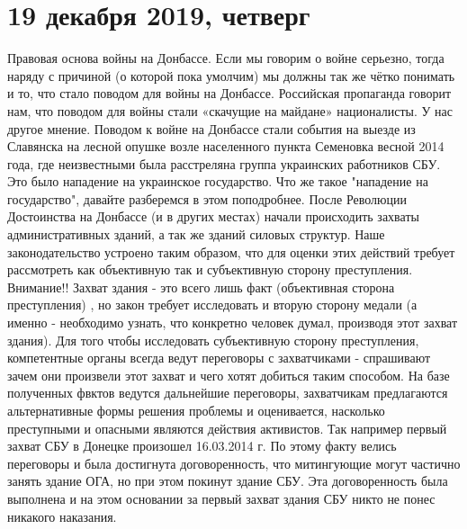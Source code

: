  
 
 
 
 
\section{19 декабря 2019, четверг}
\label{sec:19_12_2019}

Правовая основа войны на Донбассе.
Если мы говорим о войне серьезно, тогда наряду с причиной (о которой пока умолчим)  мы должны так же чётко понимать и то, что стало поводом для войны на Донбассе. 
Российская пропаганда говорит нам, что поводом для войны стали «скачущие на майдане» националисты. У нас другое мнение.
Поводом к войне на Донбассе стали события на  выезде из Славянска на лесной опушке возле населенного пункта Семеновка весной 2014 года, где неизвестными была расстреляна группа украинских работников СБУ. Это было нападение на украинское государство.  
Что же такое "нападение на государство", давайте разберемся в этом поподробнее.
После Революции Достоинства на Донбассе (и в других местах)  начали происходить захваты административных зданий, а так же зданий силовых структур.  Наше законодательство устроено таким образом, что для оценки этих действий требует рассмотреть как объективную так и субъективную сторону преступления.
Внимание!!   Захват здания - это всего лишь факт (объективная сторона преступления) , но закон требует исследовать и вторую сторону медали (а именно - необходимо узнать, что конкретно человек думал, производя этот захват здания). Для того чтобы исследовать субъективную сторону преступления, компетентные  органы всегда ведут переговоры с захватчиками - спрашивают зачем они произвели этот захват и чего хотят добиться таким способом. На базе полученных фвктов ведутся дальнейшие переговоры, захватчикам предлагаются альтернативные формы решения проблемы и оценивается, насколько преступными и опасными являются действия активистов.
Так например первый захват СБУ в Донецке произошел 16.03.2014 г. По этому факту велись переговоры и была достигнута договоренность, что митингующие могут частично занять здание ОГА, но при этом покинут здание СБУ.  Эта договоренность была выполнена и на этом основании за первый захват здания СБУ никто не понес никакого наказания.  

